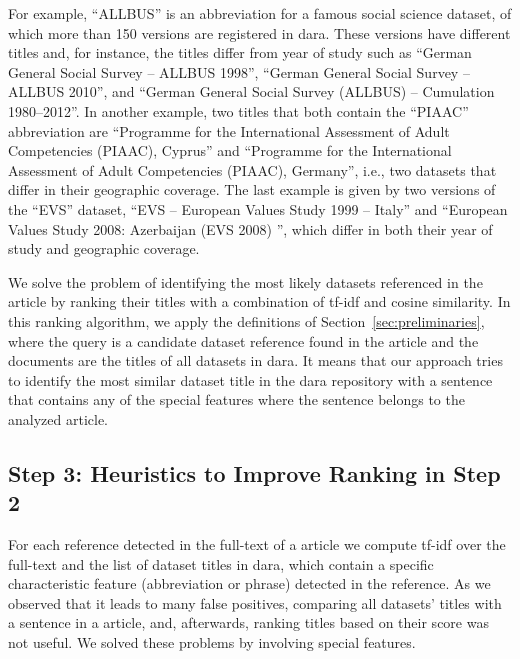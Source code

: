 \documentclass{IOS-Book-Article}
\newcommand{\dara}{\textsf{da\textbar ra}}
\begin{document}
For example, \enquote{ALLBUS} is an abbreviation for a famous social science dataset, of which more than 150 versions are registered in {\dara}.
These versions have different titles and, for instance, the titles differ from year of study such as \enquote{German General
Social Survey -- ALLBUS 1998}, 
\enquote{German General Social Survey -- ALLBUS 2010}, and \enquote{German General Social Survey (ALLBUS) -- Cumulation 1980--2012}.
In another example, two titles that both contain the \enquote{PIAAC} abbreviation are \enquote{Programme for the International Assessment of Adult Competencies (PIAAC), Cyprus} and \enquote{Programme for the International Assessment of Adult Competencies (PIAAC), Germany}, i.e., two datasets that differ in their geographic coverage.
The last example is given by two versions of the \enquote{EVS} dataset, 
\enquote{EVS -- European Values Study 1999 -- Italy} and \enquote{European Values Study 2008: Azerbaijan (EVS 2008) }, which differ in both their year of study and geographic coverage.

We solve the problem of identifying the most likely datasets referenced in the article by ranking their titles with a combination of tf-idf and cosine similarity.
In this ranking algorithm, we apply the definitions of Section~\ref{sec:preliminaries}, where the query is a candidate dataset reference found in the article and the documents are the titles of all datasets in {\dara}. 
It means that our approach tries to identify the most similar dataset title in the {\dara} repository with a sentence that contains any of the special features where the sentence belongs to the analyzed article.

\subsection{Step 3: Heuristics to Improve Ranking in Step 2}
\label{sec:heur-impr-rank}

For each reference detected in the full-text of a article we compute tf-idf over the full-text and the list of dataset titles in {\dara}, which contain a specific characteristic feature (abbreviation or phrase) detected in the reference.
As we observed that it leads to many false positives, comparing all datasets' titles with a sentence in a article, and, afterwards, ranking titles based on their score was not useful.
We solved these problems by involving special features.
\end{document}
